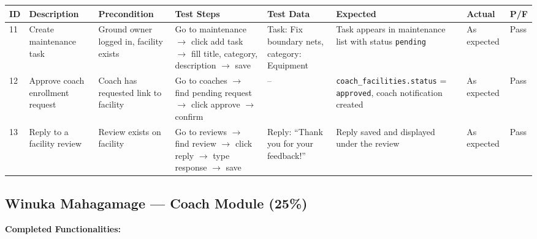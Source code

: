 \documentclass[12pt,a4paper]{report}
\begin{document}
\begin{center}
\footnotesize
\begin{longtable}{p{0.4cm} p{2.2cm} p{1.8cm} p{3.2cm} p{2.2cm} p{2.2cm} p{1.4cm} p{0.8cm}}
\toprule
\textbf{ID} & \textbf{Description} & \textbf{Precondition} & \textbf{Test Steps} & \textbf{Test Data} & \textbf{Expected} & \textbf{Actual} & \textbf{P/F}\\
\midrule
\endhead
11 & Create maintenance task & Ground owner logged in, facility exists & Go to maintenance $\to$ click add task $\to$ fill title, category, description $\to$ save & Task: Fix boundary nets, category: Equipment & Task appears in maintenance list with status \texttt{pending} & As expected & Pass\\[4pt]
12 & Approve coach enrollment request & Coach has requested link to facility & Go to coaches $\to$ find pending request $\to$ click approve $\to$ confirm & -- & \texttt{coach\_facilities.status} = \texttt{approved}, coach notification created & As expected & Pass\\[4pt]
13 & Reply to a facility review & Review exists on facility & Go to reviews $\to$ find review $\to$ click reply $\to$ type response $\to$ save & Reply: ``Thank you for your feedback!'' & Reply saved and displayed under the review & As expected & Pass\\
\bottomrule
\end{longtable}
\end{center}

\subsection{Winuka Mahagamage --- Coach Module (25\%)}

\textbf{Completed Functionalities:}
\end{document}
